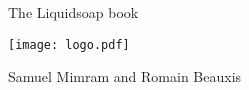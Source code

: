 \documentclass[12pt]{article}
\begin{document}
\pagecolor{Purple!10}

\thispagestyle{empty}
\begin{center}
  \phantom{x}
  \vspace{10ex}

  {\HUGE The Liquidsoap book}

  \vfill

  \texttt{[image: logo.pdf]}

  \vfill

  {\Large Samuel Mimram and Romain Beauxis}

  \vspace{10mm}
\end{center}
\end{document}

